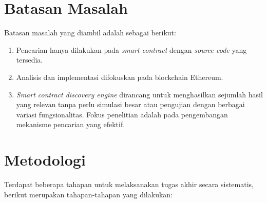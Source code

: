 \section{Batasan Masalah}
\label{sec:batasan-masalah}


Batasan masalah yang diambil adalah sebagai berikut:

\begin{enumerate}
  \item Pencarian hanya dilakukan pada \textit{smart contract} dengan \textit{source code} yang tersedia.
  \item Analisis dan implementasi difokuskan pada blockchain Ethereum.
  \item \textit{Smart contract discovery engine} dirancang untuk menghasilkan sejumlah hasil yang relevan tanpa perlu simulasi besar atau pengujian dengan berbagai variasi fungsionalitas. Fokus penelitian adalah pada pengembangan mekanisme pencarian yang efektif.
\end{enumerate}


\section{Metodologi}
\label{sec:metodologi}


Terdapat beberapa tahapan untuk melaksanakan tugas akhir secara sistematis, berikut merupakan tahapan-tahapan yang dilakukan:

